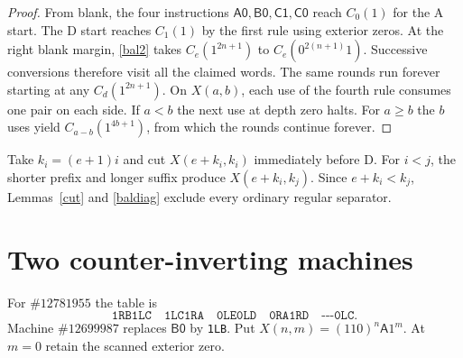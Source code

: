 \documentclass[11pt]{article}
\newcommand{\state}[1]{\mathsf{#1}}
\newcommand{\word}[1]{\texttt{#1}}
\begin{document}
\begin{proof}
From blank, the four instructions \(\state{A0,B0,C1,C0}\) reach \(C_0(1)\) for the A start. The D start reaches \(C_1(1)\) by the first rule using exterior zeros. At the right blank margin, \eqref{bal2} takes \(C_e(1^{2n+1})\) to \(C_e(0^{2(n+1)}1)\). Successive conversions therefore visit all the claimed words. The same rounds run forever starting at any \(C_d(1^{2n+1})\). On \(X(a,b)\), each use of the fourth rule consumes one pair on each side. If \(a<b\) the next use at depth zero halts. For \(a\ge b\) the \(b\) uses yield \(C_{a-b}(1^{4b+1})\), from which the rounds continue forever.
\end{proof}

Take \(k_i=(e+1)i\) and cut \(X(e+k_i,k_i)\) immediately before D. For \(i<j\), the shorter prefix and longer suffix produce \(X(e+k_i,k_j)\). Since \(e+k_i<k_j\), Lemmas~\ref{cut} and \ref{baldiag} exclude every ordinary regular separator.

\section{Two counter-inverting machines}

For \(\#12781955\) the table is
\[
\word{1RB1LC}\quad\word{1LC1RA}\quad\word{0LE0LD}\quad
\word{0RA1RD}\quad\word{-{}-{}-0LC}.
\]
Machine \(\#12699987\) replaces \(\state{B0}\) by \word{1LB}. Put \(X(n,m)=(110)^n\state A1^m\). At \(m=0\) retain the scanned exterior zero.
\end{document}
